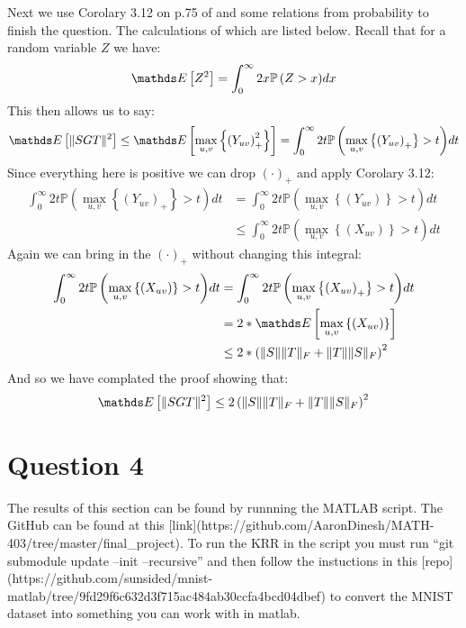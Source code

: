 Next we use Corolary 3.12 on p.75 of \cite{Ledoux2011Probability} and some relations from probability to finish the question. The calculations of which
are listed below. Recall that for a random variable $Z$ we have:
\begin{equation*}
    \pexp{Z^2} = \int_{0}^{\infty}{2x\mathbb{P}\left(Z > x \right)} dx
\end{equation*}
This then allows us to say:
\begin{align*}
    \pexp{\norm{SGT}^2} \leq \pexp{\underset{u,v}{\max}\left\{ \left(Y_{uv}\right)_{+}^2 \right \}} = \int_{0}^{\infty}{2t\mathbb{P}\left(\underset{u,v}{\max}\left\{ \left(Y_{uv}\right)_{+} \right\} > t \right)} dt 
\end{align*}
Since everything here is positive we can drop $(\cdot)_{+}$ and apply Corolary 3.12:
\begin{align*}
    \int_{0}^{\infty}{2t\mathbb{P}\left(\underset{u,v}{\max}\left\{ \left(Y_{uv}\right)_{+} \right\} > t \right)} dt  &= \int_{0}^{\infty}{2t\mathbb{P}\left(\underset{u,v}{\max}\left\{ \left(Y_{uv}\right) \right\} > t \right)} dt \\
                                                                                                                    &\leq \int_{0}^{\infty}{2t\mathbb{P}\left(\underset{u,v}{\max}\left\{ \left(X_{uv}\right) \right\} > t \right)} dt 
\end{align*}
Again we can bring in the $(\cdot)_{+}$ without changing this integral:
\begin{align*}
    \int_{0}^{\infty}{2t\mathbb{P}\left(\underset{u,v}{\max}\left\{ \left(X_{uv}\right) \right\} > t \right)} dt &= \int_{0}^{\infty}{2t\mathbb{P}\left(\underset{u,v}{\max}\left\{ \left(X_{uv}\right)_{+} \right\} > t \right)} dt \\
                                                                                                               &= 2*\pexp{\underset{u,v}{\max}\left\{(X_{uv})\right\}} \\
                                                                                                               &\leq  2*\left( \norm{S}\norm{T}_F +\norm{T}\norm{S}_F\right)^2
\end{align*}
And so we have complated the proof showing that:
\begin{equation*}
    \pexp{\norm{SGT}^2} \leq 2\left( \norm{S}\norm{T}_F +\norm{T}\norm{S}_F\right)^2
\end{equation*}

\section{Question 4}
The results of this section can be found by runnning the MATLAB script. The GitHub can be found at this
[link](https://github.com/AaronDinesh/MATH-403/tree/master/final_project). To run the KRR in the script you must run
``git submodule update --init --recursive'' and then follow the instuctions in this
[repo](https://github.com/sunsided/mnist-matlab/tree/9fd29f6c632d3f715ac484ab30ccfa4bcd04dbef) to convert the MNIST
dataset into something you can work with in matlab.